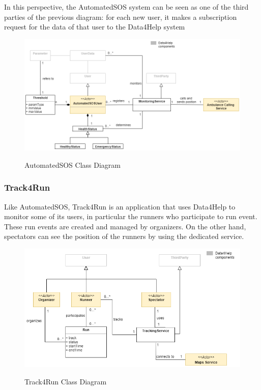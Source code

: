 In this perspective, the AutomatedSOS system can be seen as one of the third parties of the previous diagram: for each new user, it makes a subscription request for the data of that user to the Data4Help system

\FloatBarrier
\begin{figure}[h!]
	\centering
	\includegraphics[width = \linewidth] {../Diagrams/ClassDiagram-AutomatedSOS.png}\\[1.0 cm]
	\caption{AutomatedSOS Class Diagram}
\end{figure}
\FloatBarrier

\newpage

\subsubsection{Track4Run}
Like AutomatedSOS, Track4Run is an application that uses Data4Help to monitor some of its users, in particular the runners who participate to run event.
These run events are created and managed by organizers. On the other hand, spectators can see the position of the runners by using the dedicated service.

\FloatBarrier
\begin{figure}[h!]
	\centering
	\includegraphics[width = \linewidth] {../Diagrams/ClassDiagram-Track4Run.png}\\[1.0 cm]
	\caption{Track4Run Class Diagram}
\end{figure}
\FloatBarrier

